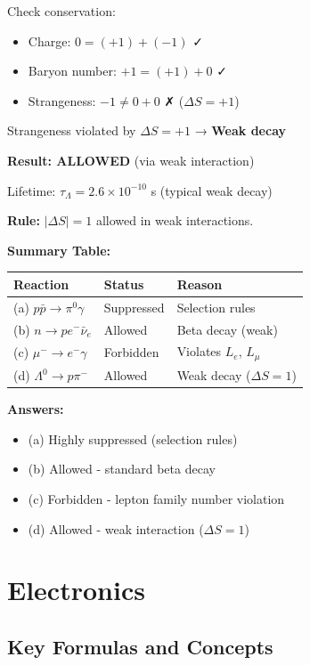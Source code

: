 \documentclass[12pt,a4paper]{article}
\begin{document}
\begin{solution}
Check conservation:
\begin{itemize}
    \item Charge: $0 = (+1) + (-1)$ ✓
    \item Baryon number: $+1 = (+1) + 0$ ✓
    \item Strangeness: $-1 \neq 0 + 0$ ✗ ($\Delta S = +1$)
\end{itemize}

Strangeness violated by $\Delta S = +1$ → \textbf{Weak decay}

\textbf{Result: ALLOWED} (via weak interaction)

Lifetime: $\tau_\Lambda = 2.6 \times 10^{-10}$ s (typical weak decay)

\textbf{Rule:} $|\Delta S| = 1$ allowed in weak interactions.

\textbf{Summary Table:}
\begin{tabular}{|l|l|l|}
\hline
Reaction & Status & Reason \\
\hline
(a) $p\bar{p} \to \pi^0\gamma$ & Suppressed & Selection rules \\
(b) $n \to pe^-\bar{\nu}_e$ & Allowed & Beta decay (weak) \\
(c) $\mu^- \to e^-\gamma$ & Forbidden & Violates $L_e$, $L_\mu$ \\
(d) $\Lambda^0 \to p\pi^-$ & Allowed & Weak decay ($\Delta S = 1$) \\
\hline
\end{tabular}

\textbf{Answers:}
\begin{itemize}
    \item (a) Highly suppressed (selection rules)
    \item (b) Allowed - standard beta decay
    \item (c) Forbidden - lepton family number violation
    \item (d) Allowed - weak interaction ($\Delta S = 1$)
\end{itemize}
\end{solution}

\newpage

\section{Electronics}

\subsection{Key Formulas and Concepts}
\end{document}
